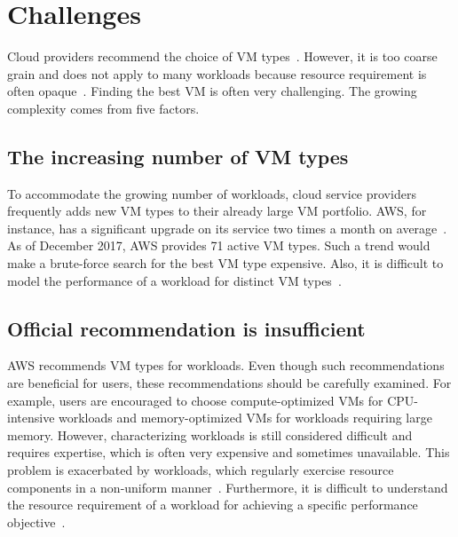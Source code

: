 \section{Challenges}
\label{sec:cat::challenges}


Cloud providers recommend the choice of VM types~\cite{aws, google_rightsizing}.
However, it is too coarse grain and does not
apply to many workloads because
resource requirement is often opaque~\cite{Yadwadkar2017}.
Finding the best VM is often very challenging.
The growing complexity comes from five factors.

\subsection*{The increasing number of VM types}
To accommodate the growing number of workloads,
cloud service providers frequently adds new VM types to their already large VM portfolio. AWS, for instance, has a significant upgrade on its service two times a month on average~\cite{ec2history}.
As of December 2017, AWS provides 71 active VM types.
Such a trend would make a brute-force search for the best VM type expensive. Also, it is difficult to model the performance of a workload for distinct VM types~\cite{Yadwadkar2017}. 


\subsection*{Official recommendation is insufficient}
AWS recommends VM types for workloads.
Even though such recommendations are beneficial for users, these recommendations
should be carefully examined. 
For example, users are encouraged to choose
compute-optimized VMs for CPU-intensive workloads and
memory-optimized VMs for workloads requiring large memory.
However, characterizing workloads is still considered difficult and requires expertise, which is often very expensive and sometimes unavailable. This problem is exacerbated by workloads, which regularly exercise resource components in a non-uniform manner~\cite{Ousterhout2017}.
Furthermore, it is difficult to understand the resource requirement of
a workload for achieving a specific performance objective~\cite{Yadwadkar2017}.

